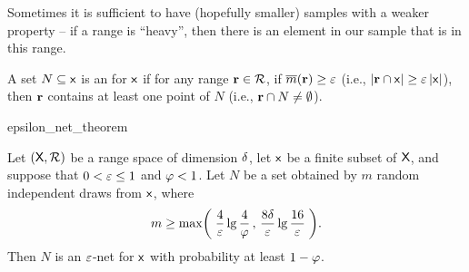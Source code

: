 
\medskip


Sometimes it is sufficient to have (hopefully smaller) samples with a
weaker property -- if a range is ``heavy'', then there is an element in
our sample that is in this range.

\begin{defn}
    A set $N \subseteq \mathsf{x}$ is an
     for $\mathsf{x}$ if
    for any range $\mathbf{r} \in {\mathcal{R}}$, if $\Measure{\range} \geq
    \eps$ (i.e., $\left| {\mathbf{r} \cap \mathsf{x}} \right| \geq {\varepsilon}
    \left| {\mathsf{x}} \right|$), then $\mathbf{r}$ contains at least one point
    of $N$ (i.e., $\mathbf{r} \cap N \ne \emptyset$).
\end{defn}


\begin{fragment}{epsilon_net_theorem}
    \begin{theorem}
        Let $(\textsf{X},{\mathcal{R}})$ be a range s{}p\-ace of \VC dimension
        $\delta$, let $\mathsf{x}$ be a finite subset of $\textsf{X}$,
        and suppose that $0 < {\varepsilon} \leq 1$ and $\varphi < 1$. Let $N$
        be a set obtained by $m$ random independent draws from
        $\mathsf{x}$, where
        \begin{equation}
            m \geq \max\pth{\;
               \frac{4}{\eps} \lg \frac{4}{\BadProb} \,,\,
               \frac{8\Dim}{\eps}\lg \frac{16}{\eps} \;}.
            \eqlab{e:net}
        \end{equation}
        Then $N$ is an ${\varepsilon}$-net for $\mathsf{x}$ with probability
        at least $1-\varphi$.
    \end{theorem}
\end{fragment}


